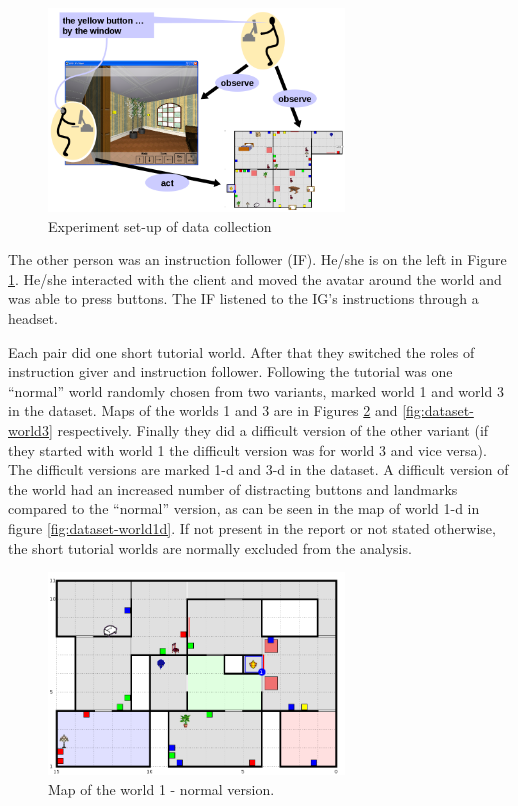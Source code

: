 \begin{figure}[!htbp]
  \centering
	\includegraphics[width=0.7\textwidth]{Images/experiment-set-up}
	\caption{Experiment set-up of data collection}
	\label{fig:give-experiment-setup}
\end{figure}

The other person was an instruction follower (IF). He/she is on the left in Figure \ref{fig:give-experiment-setup}. He/she interacted with the client and moved the avatar around the world and was able to press buttons. The IF listened to the IG's instructions through a headset.

Each pair did one short tutorial world. After that they switched the roles of instruction giver and instruction follower. Following the tutorial was one ``normal'' world randomly chosen from two variants, marked world 1 and world 3 in the dataset. Maps of the worlds 1 and 3 are in Figures \ref{fig:dataset-world1} and \ref{fig:dataset-world3} respectively. Finally they did a difficult version of the other variant (if they started with world 1 the difficult version was for world 3 and vice versa). The difficult versions are marked 1-d and 3-d in the dataset. A difficult version of the world had an increased number of distracting buttons and landmarks compared to the ``normal'' version, as can be seen in the map of world 1-d in figure \ref{fig:dataset-world1d}. If not present in the report or not stated otherwise, the short tutorial worlds are normally excluded from the analysis.

\begin{figure}[!htbp]
  \centering
	\includegraphics[width=0.7\textwidth]{Images/dataset-world1}
	\caption{Map of the world 1 - normal version.}
	\label{fig:dataset-world1}
\end{figure}


